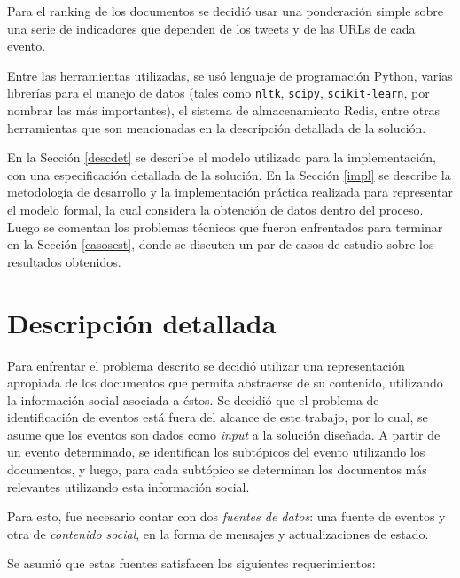   Para el ranking de los documentos se decidió usar una ponderación
  simple sobre una serie de indicadores que dependen de los tweets y
  de las URLs de cada evento.

  Entre las herramientas utilizadas, se usó lenguaje de
  programación Python, varias librerías para el manejo de datos
  (tales como \texttt{nltk}, \texttt{scipy}, \texttt{scikit-learn}, por nombrar las más
  importantes), el sistema de almacenamiento Redis, entre otras
  herramientas que son mencionadas en la descripción detallada de la
  solución.

  En la Sección \ref{descdet} se describe el modelo utilizado para la
  implementación, con una especificación detallada de la solución. En la
  Sección \ref{impl} se describe la metodología de desarrollo y la
  implementación práctica realizada para representar el modelo
  formal, la cual considera la obtención de datos dentro del
  proceso. Luego se comentan los problemas técnicos que fueron
  enfrentados para terminar en la Sección \ref{casosest}, donde se discuten
  un par de casos de estudio sobre los resultados obtenidos.


\section{Descripción detallada}
\label{sec-4.1}

\label{descdet}


   Para enfrentar el problema descrito se decidió utilizar una
   representación apropiada de los documentos que permita abstraerse
   de su contenido, utilizando la información social asociada a
   éstos. Se decidió que el problema de identificación de eventos está
   fuera del alcance de este trabajo, por lo cual, se asume que los
   eventos son dados como \emph{input} a la solución diseñada. A partir de un
   evento determinado, se identifican los  subtópicos del evento
   utilizando los documentos, y luego, para cada
   subtópico se determinan los documentos más relevantes utilizando
   esta información social.

   Para esto, fue necesario contar con dos \emph{fuentes de datos}: una
   fuente de eventos y otra de \emph{contenido social}, en la forma de
   mensajes y actualizaciones de estado.

   Se asumió que estas fuentes satisfacen los siguientes
   requerimientos:

